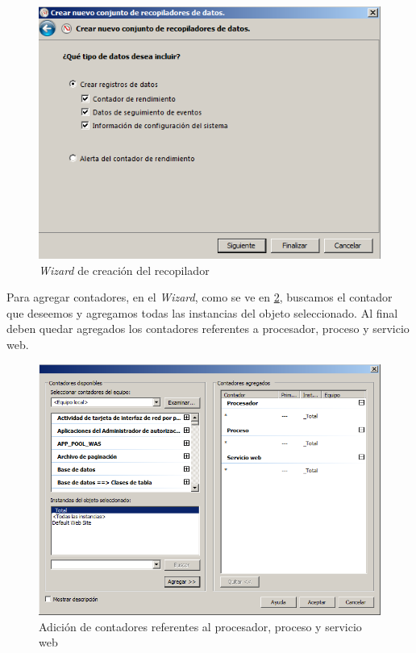 \begin{figure}[H]
	\centering
	\includegraphics[scale=0.6]{cuestion5-crear-reg.png}
	\caption{\textit{Wizard} de creación del recopilador} \label{cuestion5-crear-reg}
\end{figure}

Para agregar contadores, en el \textit{Wizard}, como se ve en \ref{cuestion5-agregar-contador}, buscamos el contador que deseemos y agregamos todas las instancias del objeto seleccionado. Al final deben quedar agregados los contadores referentes a procesador, proceso y servicio web.

\begin{figure}[H]
	\centering
	\includegraphics[scale=0.6]{cuestion5-agregar-contador.png}
	\caption{Adición de contadores referentes al procesador, proceso y servicio web} \label{cuestion5-agregar-contador}
\end{figure}

